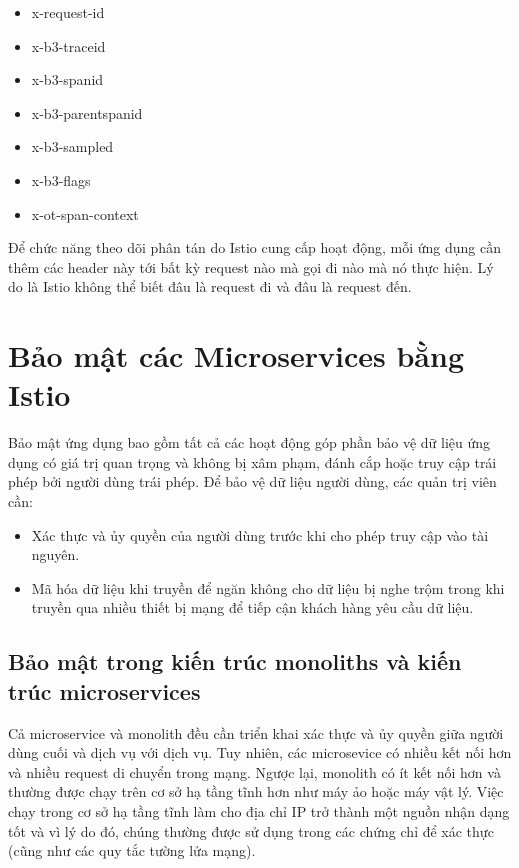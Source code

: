 \documentclass[14pt,a4paper]{book}
\begin{document}
{{		\begin{itemize}				
			\item x-request-id
			\item x-b3-traceid
			\item x-b3-spanid
			\item x-b3-parentspanid
			\item x-b3-sampled
			\item x-b3-flags
			\item x-ot-span-context
		\end{itemize}
		
		Để chức năng theo dõi phân tán do Istio cung cấp hoạt động, mỗi ứng dụng cần thêm các header này tới bất kỳ request nào mà gọi đi nào mà nó thực hiện. Lý do là Istio không thể biết đâu là request đi và đâu là request đến.
		
	\section{Bảo mật các Microservices bằng Istio}
		{\hspace{0.6cm}Bảo mật ứng dụng bao gồm tất cả các hoạt động góp phần bảo vệ dữ liệu ứng dụng có giá trị quan trọng và không bị xâm phạm, đánh cắp hoặc truy cập trái phép bởi người dùng trái phép. Để bảo vệ dữ liệu người dùng, các quản trị viên cần:}
		\begin{itemize}
			\item Xác thực và ủy quyền của người dùng trước khi cho phép truy cập vào tài nguyên.
			\item Mã hóa dữ liệu khi truyền để ngăn không cho dữ liệu bị nghe trộm trong khi truyền qua nhiều thiết bị mạng để tiếp cận khách hàng yêu cầu dữ liệu.
		\end{itemize}
		
		\subsection{Bảo mật trong kiến trúc monoliths và kiến trúc microservices}
			{\hspace{0.6cm}Cả microservice và monolith đều cần triển khai xác thực và ủy quyền giữa người dùng cuối và dịch vụ với dịch vụ. Tuy nhiên, các microsevice có nhiều kết nối hơn và nhiều request di chuyển trong mạng. Ngược lại, monolith có ít kết nối hơn và thường được chạy trên cơ sở hạ tầng tĩnh hơn như máy ảo hoặc máy vật lý. Việc chạy trong cơ sở hạ tầng tĩnh làm cho địa chỉ IP trở thành một nguồn nhận dạng tốt và vì lý do đó, chúng thường được sử dụng trong các chứng chỉ để xác thực (cũng như các quy tắc tường lửa mạng).}
			
}}
\end{document}
